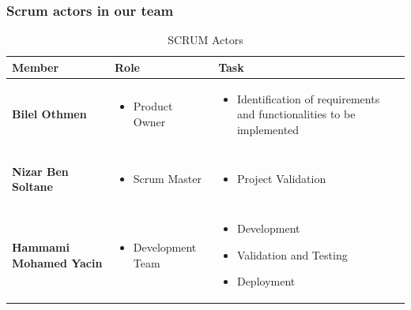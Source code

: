 \subsubsection{Scrum actors in our team}

\begin{table}[H]
    \centering
    \begin{tabular}{|p{5cm}|p{5cm}|p{6.5cm}|}
    \hline
    \textbf{Member} & \textbf{Role} & \textbf{Task} \\ \hline
    \begin{center}
        \textbf{Bilel Othmen}
    \end{center} & \begin{itemize}
        \item Product Owner
    \end{itemize} & \begin{itemize}
        \item Identification of requirements and functionalities to be implemented
    \end{itemize} \\ \hline

    \begin{center}
        \textbf{Nizar Ben Soltane}
    \end{center} & \begin{itemize}
        \item Scrum Master
    \end{itemize} & \begin{itemize}
        \item Project Validation
    \end{itemize} \\ \hline

    \begin{center}
        \textbf{Hammami Mohamed Yacin}
    \end{center} & \begin{itemize}
        \item Development Team
    \end{itemize} & \begin{itemize}
        \item Development
        \item Validation and Testing
        \item Deployment
    \end{itemize} \\ \hline
    \end{tabular}
    \caption{SCRUM Actors}
    \label{tab:my_label}
    \setlength{\abovecaptionskip}{0.25cm}
\end{table}

